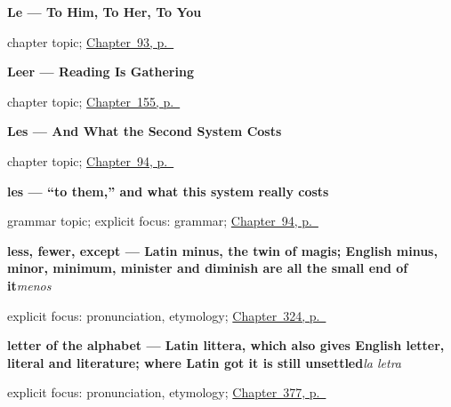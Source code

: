 \noindent\begin{minipage}[t]{\linewidth}
\raggedright
\textbf{Le --- To Him, To Her, To You}\par
\footnotesize chapter topic; \hyperref[ch:pronoun-le]{Chapter~93, p.~\pageref*{ch:pronoun-le}}
\end{minipage}\par\smallskip

\noindent\begin{minipage}[t]{\linewidth}
\raggedright
\textbf{Leer — Reading Is Gathering}\par
\footnotesize chapter topic; \hyperref[ch:spanish-leer]{Chapter~155, p.~\pageref*{ch:spanish-leer}}
\end{minipage}\par\smallskip

\noindent\begin{minipage}[t]{\linewidth}
\raggedright
\textbf{Les --- And What the Second System Costs}\par
\footnotesize chapter topic; \hyperref[ch:pronoun-les]{Chapter~94, p.~\pageref*{ch:pronoun-les}}
\end{minipage}\par\smallskip

\noindent\begin{minipage}[t]{\linewidth}
\raggedright
\textbf{les — \textquotedblleft{}to them,\textquotedblright{} and what this system really costs}\par
\footnotesize grammar topic; explicit focus: grammar; \hyperref[ch:pronoun-les]{Chapter~94, p.~\pageref*{ch:pronoun-les}}
\end{minipage}\par\smallskip

\noindent\begin{minipage}[t]{\linewidth}
\raggedright
\textbf{less, fewer, except — Latin minus, the twin of magis; English minus, minor, minimum, minister and diminish are all the small end of it}\enspace\emph{menos}\par
\footnotesize explicit focus: pronunciation, etymology; \hyperref[ch:verdad-y-siquiera]{Chapter~324, p.~\pageref*{ch:verdad-y-siquiera}}
\end{minipage}\par\smallskip

\noindent\begin{minipage}[t]{\linewidth}
\raggedright
\textbf{letter of the alphabet — Latin littera, which also gives English letter, literal and literature; where Latin got it is still unsettled}\enspace\emph{la letra}\par
\footnotesize explicit focus: pronunciation, etymology; \hyperref[ch:la-letra-y-la-frase]{Chapter~377, p.~\pageref*{ch:la-letra-y-la-frase}}
\end{minipage}\par\smallskip

